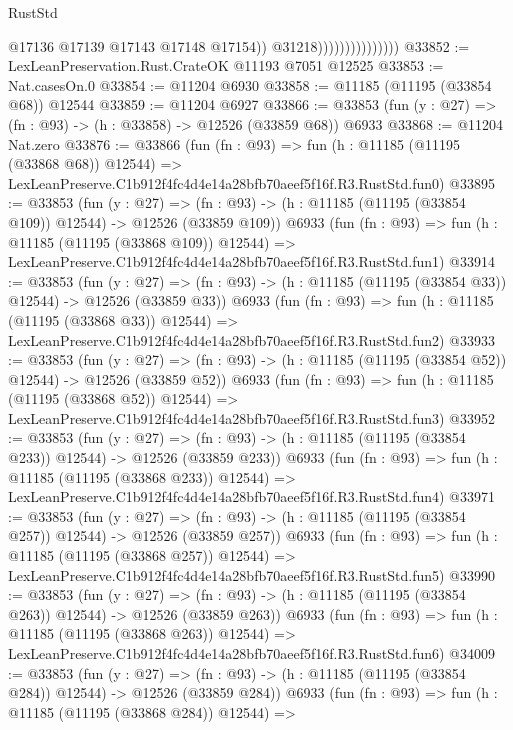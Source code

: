 \begin{lexlean}{RustStd}
\begin{coremodule}
                                      @17136
                                      @17139
                                      @17143
                                      @17148
                                      @17154))
                                  @31218)))))))))))))))
@33852 := LexLeanPreservation.Rust.CrateOK @11193 @7051 @12525
@33853 := Nat.casesOn.{0}
@33854 := @11204 @6930
@33858 := @11185 (@11195 (@33854 @68)) @12544
@33859 := @11204 @6927
@33866 := @33853 (fun (y : @27) => (fn : @93) -> (h : @33858) -> @12526 (@33859 @68)) @6933
@33868 := @11204 Nat.zero
@33876 := @33866
    (fun (fn : @93) =>
    fun (h : @11185 (@11195 (@33868 @68)) @12544) =>
    LexLeanPreserve.C1b912f4fc4d4e14a28bfb70aeef5f16f.R3.RustStd.fun0)
@33895 := @33853
    (fun (y : @27) =>
    (fn : @93) -> (h : @11185 (@11195 (@33854 @109)) @12544) -> @12526 (@33859 @109))
    @6933
    (fun (fn : @93) =>
    fun (h : @11185 (@11195 (@33868 @109)) @12544) =>
    LexLeanPreserve.C1b912f4fc4d4e14a28bfb70aeef5f16f.R3.RustStd.fun1)
@33914 := @33853
    (fun (y : @27) =>
    (fn : @93) -> (h : @11185 (@11195 (@33854 @33)) @12544) -> @12526 (@33859 @33))
    @6933
    (fun (fn : @93) =>
    fun (h : @11185 (@11195 (@33868 @33)) @12544) =>
    LexLeanPreserve.C1b912f4fc4d4e14a28bfb70aeef5f16f.R3.RustStd.fun2)
@33933 := @33853
    (fun (y : @27) =>
    (fn : @93) -> (h : @11185 (@11195 (@33854 @52)) @12544) -> @12526 (@33859 @52))
    @6933
    (fun (fn : @93) =>
    fun (h : @11185 (@11195 (@33868 @52)) @12544) =>
    LexLeanPreserve.C1b912f4fc4d4e14a28bfb70aeef5f16f.R3.RustStd.fun3)
@33952 := @33853
    (fun (y : @27) =>
    (fn : @93) -> (h : @11185 (@11195 (@33854 @233)) @12544) -> @12526 (@33859 @233))
    @6933
    (fun (fn : @93) =>
    fun (h : @11185 (@11195 (@33868 @233)) @12544) =>
    LexLeanPreserve.C1b912f4fc4d4e14a28bfb70aeef5f16f.R3.RustStd.fun4)
@33971 := @33853
    (fun (y : @27) =>
    (fn : @93) -> (h : @11185 (@11195 (@33854 @257)) @12544) -> @12526 (@33859 @257))
    @6933
    (fun (fn : @93) =>
    fun (h : @11185 (@11195 (@33868 @257)) @12544) =>
    LexLeanPreserve.C1b912f4fc4d4e14a28bfb70aeef5f16f.R3.RustStd.fun5)
@33990 := @33853
    (fun (y : @27) =>
    (fn : @93) -> (h : @11185 (@11195 (@33854 @263)) @12544) -> @12526 (@33859 @263))
    @6933
    (fun (fn : @93) =>
    fun (h : @11185 (@11195 (@33868 @263)) @12544) =>
    LexLeanPreserve.C1b912f4fc4d4e14a28bfb70aeef5f16f.R3.RustStd.fun6)
@34009 := @33853
    (fun (y : @27) =>
    (fn : @93) -> (h : @11185 (@11195 (@33854 @284)) @12544) -> @12526 (@33859 @284))
    @6933
    (fun (fn : @93) =>
    fun (h : @11185 (@11195 (@33868 @284)) @12544) =>

\end{coremodule}
\end{lexlean}
